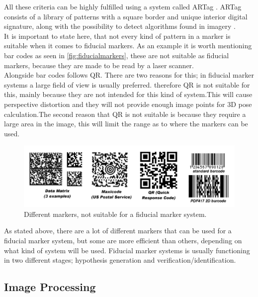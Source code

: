 				All these criteria can be highly fulfilled using a system called ARTag \cite{fiducialARTag}. ARTag consists of a library of patterns with a square border and unique interior digital signature, along with the possibility to detect algorithms found in imagery \cite{fiducialMarkers}.\\
				
				It is important to state here, that not every kind of pattern in a marker is suitable when it comes to fiducial markers\cite{fiducialMarkers}. As an example it is worth mentioning bar codes as seen in \autoref{fig:fiducialmarkers}, these are not suitable as fiducial markers, because they are made to be read by a laser scanner.\\
				Alongside bar codes follows QR. There are two reasons for this; in fiducial marker systems a large field of view is usually preferred. therefore QR is not suitable for this, mainly because they are not intended for this kind of system.This will cause perspective distortion and they will not provide enough image points for 3D pose calculation.The second reason that QR is not suitable is because they require a large area in the image, this will limit the range as to where the markers can be used.\\ 
				
				
					\begin{figure}[H]
						\centering
						\includegraphics[width=0.9\linewidth]{figure/Analysis/fiducialmarkers.png}
						\caption{Different markers, not suitable for a fiducial marker system.}
						\label{fig:fiducialmarkers}
					\end{figure}
					
				
				As stated above, there are a lot of different markers that can be used for a fiducial marker system, but some are more efficient than others, depending on what kind of system will be used.
				Fiducial marker systems is usually functioning in two different stages; hypothesis generation and verification/identification.\\
				

		\subsection{Image Processing}
